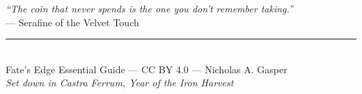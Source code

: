 \documentclass[10pt,twocolumn]{article} %
\begin{document}
\onecolumn %
\newpage
\thispagestyle{empty}
\vspace*{2cm}
\begin{center}
    {\LARGE\sffamily\itshape ``The coin that never spends is the one you don't remember taking.''}\\[1.5em]
    — Serafine of the Velvet Touch\\[2em]
    \rule{0.5\textwidth}{0.5pt}\\[1.5em]
    {\small Fate's Edge Essential Guide — CC BY 4.0 — Nicholas A. Gasper}\\[0.5em]
    {\tiny \textit{Set down in Castra Ferrum, Year of the Iron Harvest}}
\end{center}
\vspace*{1.5cm}
\end{document}
